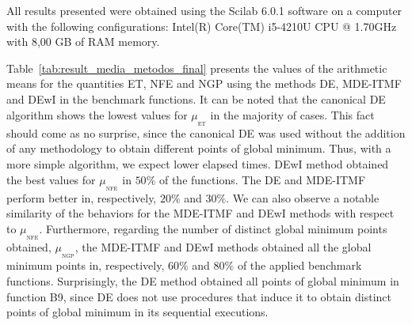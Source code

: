 \documentclass[smallextended]{svjour3}       %
\begin{document}
All results presented were obtained using the Scilab 6.0.1 software on a computer with the following configurations: Intel(R) Core(TM) i5-4210U CPU @ 1.70GHz with 8,00 GB of RAM memory. 

Table~\ref{tab:result_media_metodos_final} presents the values of the arithmetic means for the quantities ET, NFE and NGP using the methods DE, MDE-ITMF and DEwI in the benchmark functions. It can be noted that the canonical DE algorithm shows the lowest values for $\mu_{ _{\text{ET}}}$ in the majority of cases. This fact should come as no surprise, since the canonical DE was used without the addition of any methodology to obtain different points of global minimum. Thus, with a more simple algorithm, we expect lower elapsed times. DEwI method obtained the best values for $\mu_{ _{\text{NFE}}}$ in $50\%$ of the functions. The DE and MDE-ITMF perform better in, respectively, $20\%$ and $30\%$. We can also observe a notable similarity of the behaviors for the MDE-ITMF and DEwI methods with respect to $\mu_{ _{\text{NFE}}}$. Furthermore, regarding the number of distinct global minimum points obtained, $\mu_{ _{\text{NGP}}}$, the MDE-ITMF and DEwI methods obtained all the global minimum points in, respectively, $60\%$ and $80\%$ of the applied benchmark functions. Surprisingly, the DE method obtained all points of global minimum in function B9, since DE does not use procedures that induce it to obtain distinct points of global minimum in its sequential executions.
\end{document}
